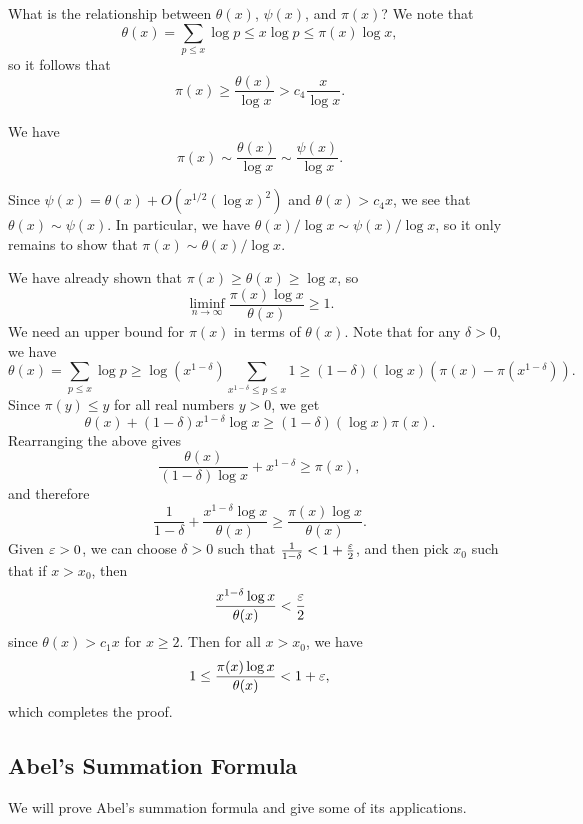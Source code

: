 What is the relationship between $\theta(x)$, $\psi(x)$, and $\pi(x)$? We note that 
\[ \theta(x) = \sum_{p \leq x} \log p \leq x \log p \leq \pi(x) \log x, \]
so it follows that 
\[ \pi(x) \geq \frac{\theta(x)}{\log x} > c_4 \frac{x}{\log x}. \]

\begin{thm}
We have 
\[ \pi(x) \sim \frac{\theta(x)}{\log x} \sim \frac{\psi(x)}{\log x}. \]
\end{thm}
\begin{pf}
Since $\psi(x) = \theta(x) + O(x^{1/2} (\log x)^2)$ and $\theta(x) > c_4x$, we see that $\theta(x) 
\sim \psi(x)$. In particular, we have $\theta(x)/\log x \sim \psi(x)/\log x$, so it only 
remains to show that $\pi(x) \sim \theta(x)/\log x$. 

We have already shown that $\pi(x) \geq \theta(x) \geq \log x$, so 
\[ \liminf_{n\to\infty} \frac{\pi(x) \log x}{\theta(x)} \geq 1. \]
We need an upper bound for $\pi(x)$ in terms of $\theta(x)$. Note that for any $\delta > 0$, we have 
\[ \theta(x) = \sum_{p\leq x} \log p \geq \log(x^{1-\delta}) \sum_{x^{1-\delta} \leq p \leq x} 1 
\geq (1-\delta)(\log x)\left(\pi(x) - \pi(x^{1-\delta})\right). \]
Since $\pi(y) \leq y$ for all real numbers $y > 0$, we get 
\[ \theta(x) + (1-\delta)x^{1-\delta} \log x \geq (1-\delta)(\log x)\pi(x). \]
Rearranging the above gives 
\[ \frac{\theta(x)}{(1-\delta)\log x} + x^{1-\delta} \geq \pi(x), \]
and therefore 
\[ \frac{1}{1-\delta} + \frac{x^{1-\delta}\log x}{\theta(x)} \geq \frac{\pi(x)\log x}{\theta(x)}. \]
Given $\varepsilon > 0$, we can choose $\delta > 0$ such that $\frac{1}{1-\delta} < 1 + \frac{\varepsilon}2$, 
and then pick $x_0$ such that if $x > x_0$, then 
\[ \frac{x^{1-\delta}\log x}{\theta(x)} < \frac{\varepsilon}2 \] 
since $\theta(x) > c_1x$ for $x \geq 2$. Then for all $x > x_0$, we have 
\[ 1 \leq \frac{\pi(x) \log x}{\theta(x)} < 1 + \varepsilon, \]
which completes the proof.
\end{pf}

\subsection{Abel's Summation Formula}
We will prove Abel's summation formula and give some of its
applications.

